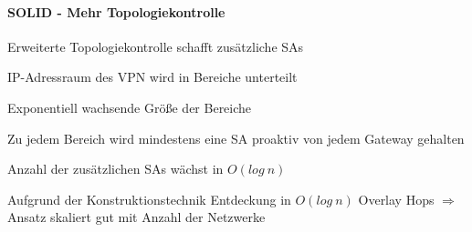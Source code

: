 \documentclass[a4paper]{article}
\begin{document}
\begin{multicols}{3}
\begin{itemize*}
            \paragraph{SOLID - Mehr
                  Topologiekontrolle}
            \begin{itemize*}
                  \item Erweiterte Topologiekontrolle schafft zusätzliche SAs
                  \item IP-Adressraum des VPN wird in Bereiche unterteilt
                  \begin{itemize*}
                        \item Exponentiell wachsende Größe der Bereiche
                  \end{itemize*}
                  \item Zu jedem Bereich wird mindestens eine SA proaktiv von jedem Gateway
                  gehalten
                  \item Anzahl der zusätzlichen SAs wächst in $O(log\ n)$
                  \item Aufgrund der Konstruktionstechnik Entdeckung in
                  $O(log\ n)$ Overlay Hops
                  $\Rightarrow$ Ansatz skaliert gut mit Anzahl der
                  Netzwerke
            \end{itemize*}


\end{itemize*}
\end{multicols}
\end{document}
